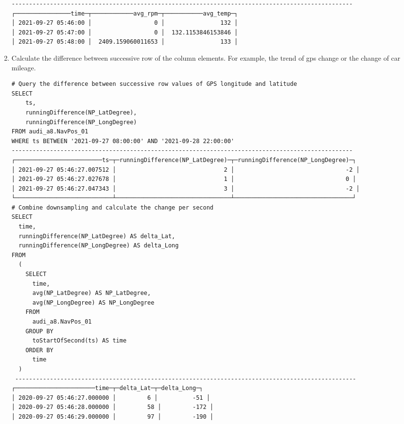 \begin{enumerate}
\begin{verbatim}
--------------------------------------------------------------------------------------------------
┌────────────────time─┬────────────avg_rpm─┬───────────avg_temp─┐
│ 2021-09-27 05:46:00 │                  0 │                132 │
│ 2021-09-27 05:47:00 │                  0 │  132.1153846153846 │
│ 2021-09-27 05:48:00 │  2409.159060011653 │                133 │
\end{verbatim}

\item Calculate the difference between successive row of the column elements. For example, the trend of \ac{gps} change or the change of car mileage.

        \begin{verbatim}
# Query the difference between successive row values of GPS longitude and latitude
SELECT 
    ts,
    runningDifference(NP_LatDegree),
    runningDifference(NP_LongDegree)
FROM audi_a8.NavPos_01
WHERE ts BETWEEN '2021-09-27 08:00:00' AND '2021-09-28 22:00:00'
--------------------------------------------------------------------------------------------------
┌─────────────────────────ts─┬─runningDifference(NP_LatDegree)─┬─runningDifference(NP_LongDegree)─┐
│ 2021-09-27 05:46:27.007512 │                               2 │                                -2 │
│ 2021-09-27 05:46:27.027678 │                               1 │                                0 │
│ 2021-09-27 05:46:27.047343 │                               3 │                                -2 │
└────────────────────────────┴─────────────────────────────────┴──────────────────────────────────┘
# Combine downsampling and calculate the change per second
SELECT
  time,
  runningDifference(NP_LatDegree) AS delta_Lat,
  runningDifference(NP_LongDegree) AS delta_Long
FROM
  (
    SELECT
      time,
      avg(NP_LatDegree) AS NP_LatDegree,
      avg(NP_LongDegree) AS NP_LongDegree
    FROM
      audi_a8.NavPos_01
    GROUP BY
      toStartOfSecond(ts) AS time
    ORDER BY
      time
  )
 --------------------------------------------------------------------------------------------------
┌───────────────────────time─┬─delta_Lat─┬─delta_Long─┐
│ 2020-09-27 05:46:27.000000 │         6 │          -51 │
│ 2020-09-27 05:46:28.000000 │         58 │         -172 │
│ 2020-09-27 05:46:29.000000 │         97 │         -190 │
\end{verbatim}

\end{enumerate}

